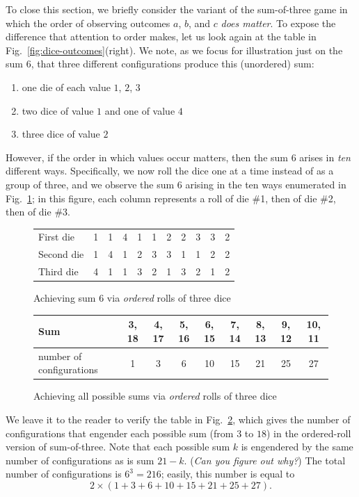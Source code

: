 \bigskip

To close this section, we briefly consider the variant of the sum-of-three game in which the order of observing outcomes $a$, $b$, and $c$ {\em does matter}.  To expose the difference that attention to order makes, let us look again at the table in Fig.~\ref{fig:dice-outcomes}(right).  We note, as we focus for illustration just on the sum $6$, that three different configurations produce this (unordered) sum:
\begin{enumerate}
\item one die of each value $1$, $2$, $3$
\medskip\item two dice of value $1$ and one of value $4$
\medskip\item three dice of value $2$
\end{enumerate}
However, if the order in which values occur matters, then the sum $6$ arises in {\em ten} different ways.  Specifically, we now roll the dice one at a time instead of as a group of three, and we observe the sum $6$ arising in the ten ways enumerated in
Fig.~\ref{fig:dice-ordered-outcomes}; in this figure, each column represents a roll of die \#1, then of die \#2, then of die \#3.
\begin{figure}[htb]
\begin{center}
\begin{tabular}{|l||c|c|c|c|c|c|c|c|c|c|}
\hline
First die & 1 & 1 & 4 & 1 & 1 & 2 & 2 & 3 & 3 & 2   \\

Second die & 1 & 4 & 1 & 2 & 3 & 3 & 1 & 1 & 2 & 2   \\

Third die & 4 & 1 & 1 & 3 & 2 & 1 & 3 & 2 & 1 & 2  \\
\hline
\end{tabular}
\end{center}
\caption{Achieving sum $6$ via {\em ordered} rolls of three dice}
\label{fig:dice-ordered-outcomes}
\end{figure}

\medskip

\begin{figure}[htb]
\begin{center}
\begin{tabular}{|l||c|c|c|c|c|c|c|c|}
\hline
Sum & 3, 18 & 4, 17 & 5, 16 & 6, 15 & 7, 14 & 8, 13 & 9, 12 & 10, 11  \\
\hline
number of configurations & 1 & 3 & 6 & 10 & 15 & 21 & 25 & 27  \\
\hline
\end{tabular}
\end{center}
\caption{Achieving all possible sums via {\em ordered} rolls of three dice}
\label{fig:dice-ordered-configs}
\end{figure}
We leave it to the reader to verify the table in Fig.~\ref{fig:dice-ordered-configs}, which gives the number of configurations that engender each possible sum (from $3$ to $18$) in the ordered-roll version of sum-of-three.  Note that each possible sum $k$ is engendered by the same number of configurations as is sum $21- k$.  ({\em Can you figure out why?})  The total number of configurations is $6^3 = 216$; easily, this number is equal to
\[ 2 \times (1 + 3 + 6 + 10 + 15 + 21 + 25 + 27). \]

